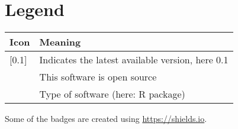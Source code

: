 \documentclass[]{article}
\begin{document}
\hypertarget{legend}{%
\section*{Legend}\label{legend}}

\begin{longtable}[]{@{}ll@{}}
\toprule
Icon & Meaning\tabularnewline
\midrule
\endhead
{[}0.1{]} & Indicates the latest available version, here 0.1\tabularnewline
& This software is open source\tabularnewline
& Type of software (here: R package)\tabularnewline
\bottomrule
\end{longtable}

Some of the badges are created using \url{https://shields.io}.
\end{document}
